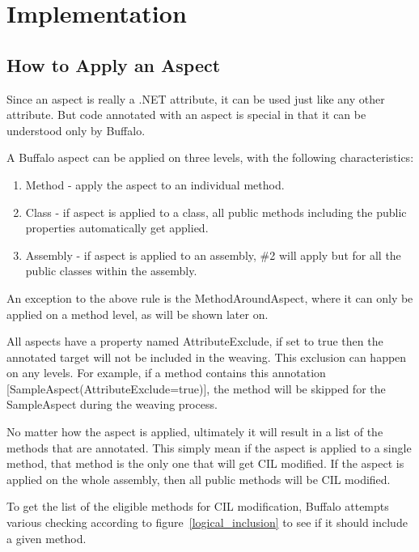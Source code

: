 \chapter{Implementation}

\section{How to Apply an Aspect}

Since an aspect is really a .NET attribute, it can be used just like any other attribute. But code annotated with an aspect is special in that it can be understood only by Buffalo.

A Buffalo aspect can be applied on three levels, with the following characteristics:

\begin{enumerate}
  \item Method - apply the aspect to an individual method.
  \item Class - if aspect is applied to a class, all public methods including the public properties automatically get applied.
  \item Assembly - if aspect is applied to an assembly, \#2 will apply but for all the public classes within the assembly.
\end{enumerate}

An exception to the above rule is the MethodAroundAspect, where it can only be applied on a method level, as will be shown later on.

All aspects have a property named AttributeExclude, if set to true then the annotated target will not be included in the weaving. This exclusion can happen on any levels. For example, if a method contains this annotation [SampleAspect(AttributeExclude=true)], the method will be skipped for the SampleAspect during the weaving process.

No matter how the aspect is applied, ultimately it will result in a list of the methods that are annotated. This simply mean if the aspect is applied to a single method, that method is the only one that will get CIL modified. If the aspect is applied on the whole assembly, then all public methods will be CIL modified.

To get the list of the eligible methods for CIL modification, Buffalo attempts various checking according to figure~\ref{logical_inclusion} to see if it should include a given method.

